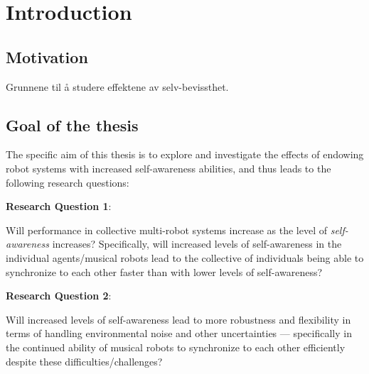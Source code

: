 \chapter{Introduction}
\label{chap:introduction}	


\section{Motivation}
Grunnene til å studere effektene av selv-bevissthet. \nl




\section{Goal of the thesis} %







The specific aim of this thesis is to explore and investigate the effects of endowing robot systems with increased self-awareness abilities, and thus leads to the following research questions: \nl




\textbf{Research Question 1}:

Will performance in collective multi-robot systems increase as the level of \textit{self-awareness} increases? Specifically, will increased levels of self-awareness in the individual agents/musical robots lead to the collective of individuals being able to synchronize to each other faster than with lower levels of self-awareness? \nl

\textbf{Research Question 2}:

Will increased levels of self-awareness lead to more robustness and flexibility in terms of handling environmental noise and other uncertainties — specifically in the continued ability of musical robots to synchronize to each other efficiently despite these difficulties/challenges? \nl


